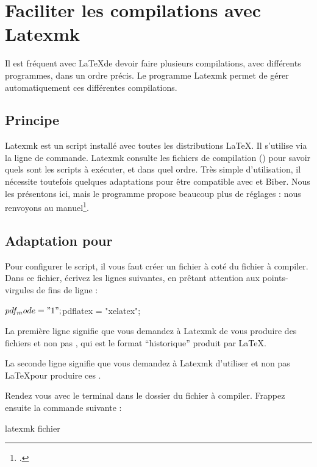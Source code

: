 \chapter{Faciliter les compilations avec Latexmk}\label{latemk}

\begin{intro}
Il est fréquent avec \LaTeX de devoir faire plusieurs compilations, avec différents programmes, dans un ordre précis. Le programme Latexmk permet de gérer automatiquement ces différentes compilations.
\end{intro}

\section{Principe}

Latexmk est un script installé avec toutes les distributions \LaTeX. Il s'utilise via la ligne de commande.
Latexmk consulte les fichiers de compilation () pour savoir quels sont les scripts à exécuter, et dans quel ordre. 
Très simple d'utilisation, il nécessite toutefois quelques adaptations pour être compatible avec \XeLaTeX et Biber. Nous les présentons ici, mais le programme propose beaucoup plus de réglages : nous renvoyons au manuel\footcite{latexmk}.

\section[Adaptation pour XeLaTeX]{Adaptation pour \XeLaTeX}

Pour configurer le script, il vous faut créer un fichier  à coté du fichier à compiler. Dans ce fichier, écrivez les lignes suivantes, en prêtant attention aux points-virgules de fins de ligne  :

\begin{bashcode}
$pdf_mode = "1";
$pdflatex = "xelatex";
\end{bashcode}

La première ligne signifie que vous demandez à Latexmk de vous produire des fichiers  et non pas , qui est le format \enquote{historique} produit par \LaTeX.

La seconde ligne signifie que vous demandez à Latexmk d'utiliser \XeLaTeX et non pas \LaTeX pour produire ces .

Rendez vous avec le terminal dans le dossier du fichier à compiler. Frappez ensuite la commande suivante :
\begin{bashcode}
latexmk fichier
\end{bashcode}

